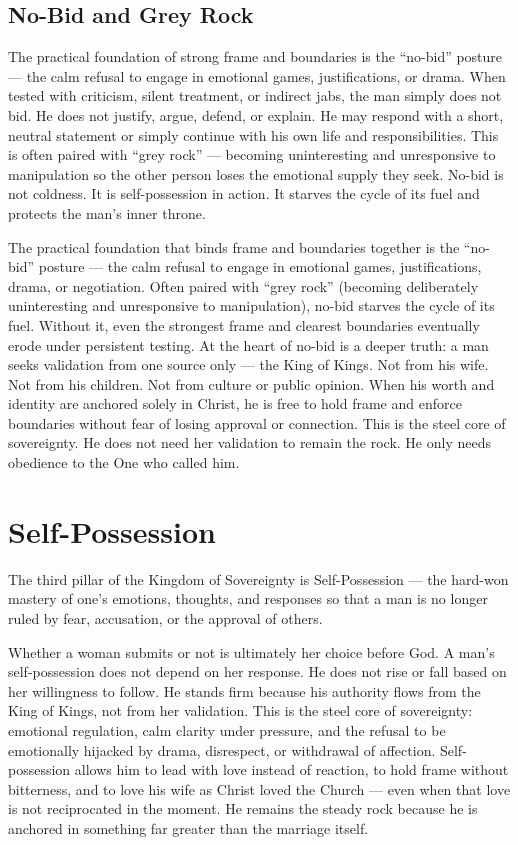 \documentclass[12pt,a4paper]{book}
\begin{document}
\subsection{No-Bid and Grey Rock}
The practical foundation of strong frame and boundaries is the “no-bid” posture — the calm refusal to engage in emotional games, justifications, or drama. When tested with criticism, silent treatment, or indirect jabs, the man simply does not bid. He does not justify, argue, defend, or explain. He may respond with a short, neutral statement or simply continue with his own life and responsibilities. This is often paired with “grey rock” — becoming uninteresting and unresponsive to manipulation so the other person loses the emotional supply they seek. No-bid is not coldness. It is self-possession in action. It starves the cycle of its fuel and protects the man’s inner throne.

The practical foundation that binds frame and boundaries together is the “no-bid” posture — the calm refusal to engage in emotional games, justifications, drama, or negotiation. Often paired with “grey rock” (becoming deliberately uninteresting and unresponsive to manipulation), no-bid starves the cycle of its fuel. Without it, even the strongest frame and clearest boundaries eventually erode under persistent testing. At the heart of no-bid is a deeper truth: a man seeks validation from one source only — the King of Kings. Not from his wife. Not from his children. Not from culture or public opinion. When his worth and identity are anchored solely in Christ, he is free to hold frame and enforce boundaries without fear of losing approval or connection. This is the steel core of sovereignty. He does not need her validation to remain the rock. He only needs obedience to the One who called him.

\section{Self-Possession}

The third pillar of the Kingdom of Sovereignty is Self-Possession — the hard-won mastery of one’s emotions, thoughts, and responses so that a man is no longer ruled by fear, accusation, or the approval of others.

Whether a woman submits or not is ultimately her choice before God. A man’s self-possession does not depend on her response. He does not rise or fall based on her willingness to follow. He stands firm because his authority flows from the King of Kings, not from her validation. This is the steel core of sovereignty: emotional regulation, calm clarity under pressure, and the refusal to be emotionally hijacked by drama, disrespect, or withdrawal of affection. Self-possession allows him to lead with love instead of reaction, to hold frame without bitterness, and to love his wife as Christ loved the Church — even when that love is not reciprocated in the moment. He remains the steady rock because he is anchored in something far greater than the marriage itself.
\end{document}
